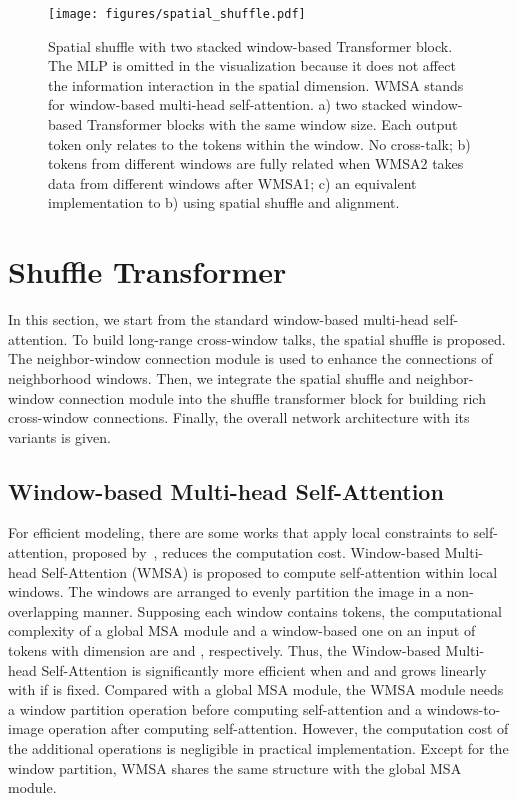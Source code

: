 \documentclass{article}
\begin{document}
\begin{figure*}[!t]
    \centering
    \texttt{[image: figures/spatial\_shuffle.pdf]}
    \caption{Spatial shuffle with two stacked window-based Transformer block. The MLP is omitted in the visualization because it does not affect the information interaction in the spatial dimension. WMSA stands for window-based multi-head self-attention. a) two stacked window-based Transformer blocks with the same window size. Each output token only relates to the tokens within the window. No cross-talk; b) tokens from different windows are fully related when WMSA2 takes data from different windows after WMSA1; c) an equivalent implementation to b) using spatial shuffle and alignment. 
    }
    \label{fig:spatial_shuffle}
    \vspace{0mm}
\end{figure*}

\section{Shuffle Transformer}
In this section, we start from the standard window-based multi-head self-attention. To build long-range cross-window talks, the spatial shuffle is proposed. The neighbor-window connection module is used to enhance the connections of neighborhood windows. Then, we integrate the spatial shuffle and neighbor-window connection module into the shuffle transformer block for building rich cross-window connections. Finally, the overall network architecture with its variants is given.

\subsection{Window-based Multi-head Self-Attention}
For efficient modeling, there are some works that apply local constraints to self-attention, proposed by~\cite{hu2019local,ramachandran2019stand,wang2020axial,liu2021Swin}, reduces the computation cost. Window-based Multi-head Self-Attention (WMSA) is proposed to compute self-attention within local windows. The windows are arranged to evenly partition the image in a non-overlapping manner. Supposing each window contains  tokens, the computational complexity of a global MSA module and a window-based one on an input of  tokens with dimension  are  and , respectively. Thus, the Window-based Multi-head Self-Attention is significantly more efficient when  and  and grows linearly with  if  is fixed. Compared with a global MSA module, the WMSA module needs a window partition operation before computing self-attention and a windows-to-image operation after computing self-attention. However, the computation cost of the additional operations is negligible in practical implementation. Except for the window partition, WMSA shares the same structure with the global MSA module.
\end{document}

